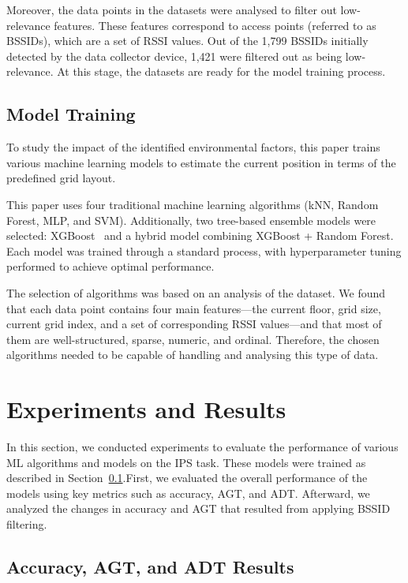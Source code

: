 \documentclass[runningheads]{llncs}
\begin{document}
Moreover, the data points in the datasets were analysed to filter out low-relevance features. These features correspond to access points (referred to as BSSIDs), which are a set of RSSI values. Out of the 1,799 BSSIDs initially detected by the data collector device, 1,421 were filtered out as being low-relevance. At this stage, the datasets are ready for the model training process.

\subsection{Model Training}\label{ssec:training}

To study the impact of the identified environmental factors, this paper trains various machine learning models to estimate the current position in terms of the predefined grid layout.

This paper uses four traditional machine learning algorithms (kNN, Random Forest, MLP, and SVM). Additionally, two tree-based ensemble models were selected: XGBoost~\cite{add2} and a hybrid model combining XGBoost + Random Forest. Each model was trained through a standard process, with hyperparameter tuning performed to achieve optimal performance.

The selection of algorithms was based on an analysis of the dataset. We found that each data point contains four main features—the current floor, grid size, current grid index, and a set of corresponding RSSI values—and that most of them are well-structured, sparse, numeric, and ordinal. Therefore, the chosen algorithms needed to be capable of handling and analysing this type of data.


\section{Experiments and Results}\label{sec:experiment-results}

In this section, we conducted experiments to evaluate the performance of various ML algorithms and models on the IPS task. These models were trained as described in Section~\ref{ssec:training}.First, we evaluated the overall performance of the models using key metrics such as accuracy, AGT, and ADT. Afterward, we analyzed the changes in accuracy and AGT that resulted from applying BSSID filtering.

\subsection{Accuracy, AGT, and ADT Results}\label{ssec:acc-agt-adt-results}
\end{document}
